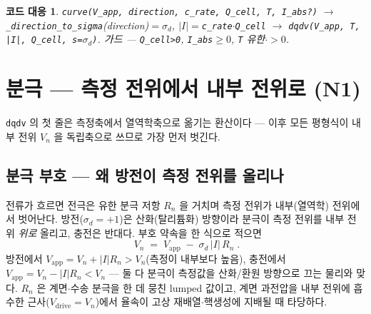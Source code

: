 \documentclass[11pt,a4paper]{article}
\newtheorem*{codebox}{코드 대응}
\newcommand{\app}{\mathrm{app}}
\newcommand{\sgn}{\sigma_d}
\begin{document}
\begin{codebox}
\texttt{curve(V\_app, direction, c\_rate, Q\_cell, T, I\_abs?)} $\to$ \texttt{\_direction\_to\_sigma}(direction)$=\sgn$, $|I|=$\texttt{c\_rate}$\cdot$\texttt{Q\_cell} $\to$ \texttt{dqdv(V\_app, T, |I|, Q\_cell, s=}$\sgn$\texttt{)}. 가드 — \texttt{Q\_cell>0}, \texttt{I\_abs}$\ge0$, \texttt{T} 유한$\cdot>0$.
\end{codebox}

\section{분극 — 측정 전위에서 내부 전위로 (N1)}\label{sec:pol}
\texttt{dqdv} 의 첫 줄은 측정축에서 열역학축으로 옮기는 환산이다 — 이후 모든 평형식이 내부 전위 $V_n$ 을 독립축으로 쓰므로 가장 먼저 벗긴다.

\subsection{분극 부호 — 왜 방전이 측정 전위를 올리나}
전류가 흐르면 전극은 유한 분극 저항 $R_n$ 을 거치며 측정 전위가 내부(열역학) 전위에서 벗어난다. 방전($\sgn=+1$)은 산화(탈리튬화) 방향이라 분극이 측정 전위를 내부 전위 \emph{위로} 올리고, 충전은 반대다. 부호 약속을 한 식으로 적으면
\begin{equation}
\boxed{\;V_n\;=\;V_\app\;-\;\sgn\,|I|\,R_n\;.}
\label{eq:vn}
\end{equation}
방전에서 $V_\app=V_n+|I|R_n>V_n$(측정이 내부보다 높음), 충전에서 $V_\app=V_n-|I|R_n<V_n$ — 둘 다 분극이 측정값을 산화/환원 방향으로 끄는 물리와 맞다. $R_n$ 은 계면$\cdot$수송 분극을 한 데 뭉친 lumped 값이고, 계면 과전압을 내부 전위에 흡수한 근사($V_\mathrm{drive}=V_n$)에서 율속이 고상 재배열$\cdot$핵생성에 지배될 때 타당하다.
\end{document}
